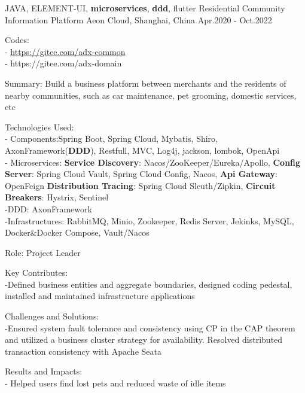 

\begin{cventries}
  \cventry
    {JAVA, ELEMENT-UI, \textbf{microservices}, \textbf{ddd}, flutter} %
    {Residential Community Information  Platform} %
    {Aeon Cloud, Shanghai, China} %
    {Apr.2020 - Oct.2022} %
    {
      \begin{cvitems} %
        \item {Codes: \\- \hyperlink{https://gitee.com/adx-common}{https://gitee.com/adx-common}  \\- https://gitee.com/adx-domain}
        \item {Summary: Build a business platform between merchants and the residents of nearby communities, such as car maintenance, pet grooming, domestic services, etc}
        \item {Technologies Used: \\- Components:Spring Boot, Spring Cloud, Mybatis, Shiro, AxonFramework(\textbf{DDD}), Restfull, MVC, Log4j, jackson, lombok, OpenApi \\- {Microservices: \textbf{Service Discovery}: { Nacos/ZooKeeper/Eureka/Apollo,} \textbf{Config Server}: Spring Cloud Vault, Spring Cloud Config, Nacos,  \textbf{Api Gateway}: OpenFeign  \textbf{Distribution Tracing}: Spring Cloud Sleuth/Zipkin, \textbf{Circuit Breakers}: Hystrix, Sentinel} \\-DDD: AxonFramework  \\-Infrastructures: RabbitMQ, Minio, Zookeeper, Redis Server, Jekinks, MySQL, Docker\&Docker Compose, Vault/Nacos }
        \item {Role: Project Leader}
        \item {Key Contributes:\\-Defined business entities and aggregate boundaries, designed coding pedestal, installed and maintained infrastructure applications  }
        \item {Challenges and Solutions: \\-Ensured system fault tolerance and consistency using CP in the CAP theorem and utilized a business cluster strategy for availability. Resolved distributed transaction consistency with Apache Seata}
        \item {{Results and Impacts}: \\- Helped users find lost pets and reduced waste of idle items  }
      \end{cvitems}
    }


\end{cventries}
